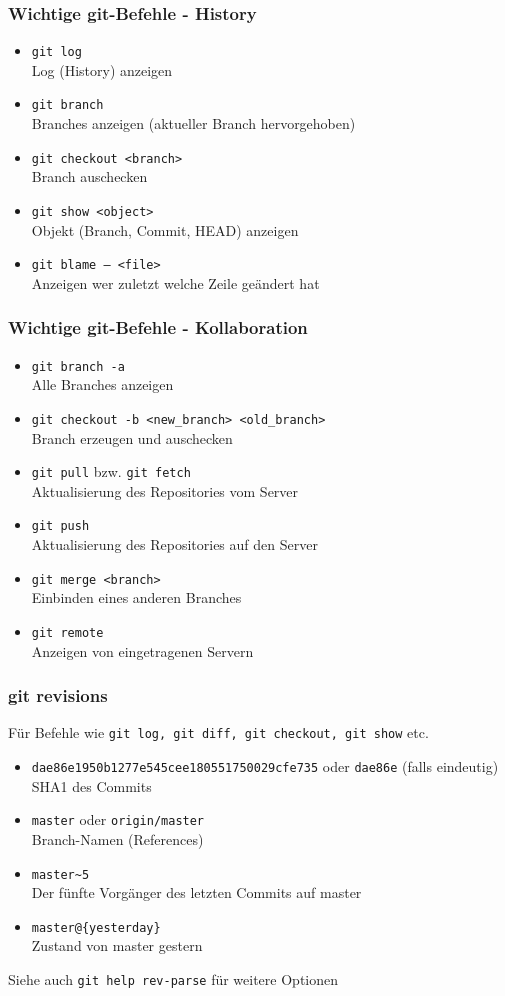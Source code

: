 \begin{frame}
  \frametitle{Wichtige git-Befehle - History}
  \begin{itemize}
    \item {\tt git log} \\ Log (History) anzeigen
    \item {\tt git branch} \\ Branches anzeigen (aktueller Branch hervorgehoben)
    \item {\tt git checkout <branch>} \\ Branch auschecken
    \item {\tt git show <object>} \\ Objekt (Branch, Commit, HEAD) anzeigen
    \item {\tt git blame -- <file>} \\ Anzeigen wer zuletzt welche Zeile geändert hat
  \end{itemize}
\end{frame}

\begin{frame}
  \frametitle{Wichtige git-Befehle - Kollaboration}
  \begin{itemize}
    \item {\tt git branch -a} \\ Alle Branches anzeigen
    \item {\tt git checkout -b <new\_branch> <old\_branch>} \\ Branch erzeugen und auschecken
    \item {\tt git pull} bzw. {\tt git fetch} \\ Aktualisierung des Repositories vom Server
    \item {\tt git push} \\ Aktualisierung des Repositories auf den Server
    \item {\tt git merge <branch>} \\ Einbinden eines anderen Branches
    \item {\tt git remote} \\ Anzeigen von eingetragenen Servern
  \end{itemize}
\end{frame}

\begin{frame}
  \frametitle{git revisions}
  \small Für Befehle wie {\tt git log, git diff, git checkout, git show} etc.
  \begin{itemize}
    \item {\tt dae86e1950b1277e545cee180551750029cfe735} oder {\tt dae86e} (falls eindeutig) \\ SHA1 des Commits
    \item {\tt master} oder {\tt origin/master} \\ Branch-Namen (References)
    \item {\tt master\~{}5} \\ Der fünfte Vorgänger des letzten Commits auf master
    \item {\tt master@\{yesterday\}} \\ Zustand von master gestern
  \end{itemize}
  Siehe auch {\tt git help rev-parse} für weitere Optionen
\end{frame}

